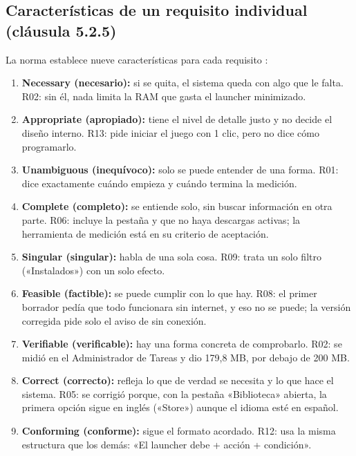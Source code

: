 \documentclass[10pt,a4paper]{article}
\begin{document}
\subsection{Caracter\'isticas de un requisito individual (cl\'ausula 5.2.5)}
La norma establece nueve caracter\'isticas para cada requisito \cite[cl.~5.2.5]{iso29148}:
\begin{enumerate}
\item \textbf{Necessary (necesario):} si se quita, el sistema queda con algo que le falta. R02: sin él, nada limita la RAM que gasta el launcher minimizado.
\item \textbf{Appropriate (apropiado):} tiene el nivel de detalle justo y no decide el diseño interno. R13: pide iniciar el juego con 1 clic, pero no dice cómo programarlo.
\item \textbf{Unambiguous (inequívoco):} solo se puede entender de una forma. R01: dice exactamente cuándo empieza y cuándo termina la medición.
\item \textbf{Complete (completo):} se entiende solo, sin buscar información en otra parte. R06: incluye la pestaña y que no haya descargas activas; la herramienta de medición está en su criterio de aceptación.
\item \textbf{Singular (singular):} habla de una sola cosa. R09: trata un solo filtro («Instalados») con un solo efecto.
\item \textbf{Feasible (factible):} se puede cumplir con lo que hay. R08: el primer borrador pedía que todo funcionara sin internet, y eso no se puede; la versión corregida pide solo el aviso de sin conexión.
\item \textbf{Verifiable (verificable):} hay una forma concreta de comprobarlo. R02: se midió en el Administrador de Tareas y dio 179,8 MB, por debajo de 200 MB.
\item \textbf{Correct (correcto):} refleja lo que de verdad se necesita y lo que hace el sistema. R05: se corrigió porque, con la pestaña «Biblioteca» abierta, la primera opción sigue en inglés («Store») aunque el idioma esté en español.
\item \textbf{Conforming (conforme):} sigue el formato acordado. R12: usa la misma estructura que los demás: «El launcher debe + acción + condición».
\end{enumerate}
\end{document}
